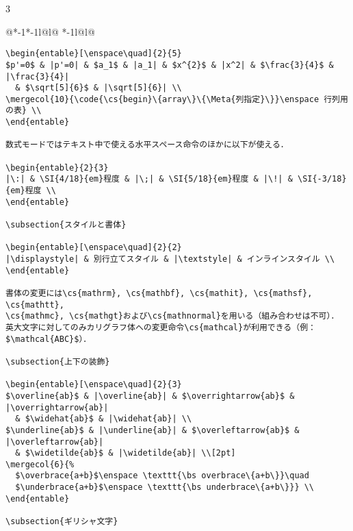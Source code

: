 \documentclass[10pt,a4paper,landscape,dvipdfmx,nomag]{jsarticle}
\makeatletter
\def\set@etsep#1#2{\def\etcolsep{#1}\def\etitemsep{#2}}
\newenvironment{entable}[3][\quad\qquad]{%
  \set@etsep#1\relax\relax
  \begin{tabular}{%
    @{}*{\the\numexpr#3-1}{*{\the\numexpr#2-1}{l@{\etcolsep}}l@{\etitemsep}}%
    *{\the\numexpr#2-1}{l@{\etcolsep}}l@{}}}{%
  \end{tabular}}
\newcommand{\mergecol}[2]{\multicolumn{#1}{@{}l@{}}{#2}}
\newcommand*\eghostguarded{%
  \ifmmode \expandafter\@firstofone
  \else \expandafter\pxqgg@eghostguarded@a
  \fi}
\def\pxqgg@eghostguarded@a#1{%
  {\pxqgg@TI\pxqgg@cwm}%
  #1%
  {\pxqgg@TI\pxqgg@cwm}}
\newcommand{\codefont}{\ttfamily\gtfamily}
\newcommand{\cs}[1]{\eghostguarded{{\codefont \bs #1}}}
\newcommand{\code}[1]{\eghostguarded{{\codefont #1}}}
\newcommand{\Meta}[1]{$\langle$\mbox{}\emph{#1}\mbox{}$\rangle$}
\makeatother
\begin{document}
\begin{multicols}{3}
\begin{entable}[\enspace]{2}{1}
\begin{verbatim}
\begin{entable}[\enspace\quad]{2}{5}
$p'=0$ & |p'=0| & $a_1$ & |a_1| & $x^{2}$ & |x^2| & $\frac{3}{4}$ & |\frac{3}{4}|
  & $\sqrt[5]{6}$ & |\sqrt[5]{6}| \\
\mergecol{10}{\code{\cs{begin}\{array\}\{\Meta{列指定}\}}\enspace 行列用の表} \\
\end{entable}

数式モードではテキスト中で使える水平スペース命令のほかに以下が使える．

\begin{entable}{2}{3}
|\:| & \SI{4/18}{em}程度 & |\;| & \SI{5/18}{em}程度 & |\!| & \SI{-3/18}{em}程度 \\
\end{entable}

\subsection{スタイルと書体}

\begin{entable}[\enspace\quad]{2}{2}
|\displaystyle| & 別行立てスタイル & |\textstyle| & インラインスタイル \\
\end{entable}

書体の変更には\cs{mathrm}, \cs{mathbf}, \cs{mathit}, \cs{mathsf}, \cs{mathtt},
\cs{mathmc}, \cs{mathgt}および\cs{mathnormal}を用いる（組み合わせは不可）．
英大文字に対してのみカリグラフ体への変更命令\cs{mathcal}が利用できる（例：$\mathcal{ABC}$）．

\subsection{上下の装飾}

\begin{entable}[\enspace\quad]{2}{3}
$\overline{ab}$ & |\overline{ab}| & $\overrightarrow{ab}$ & |\overrightarrow{ab}|
  & $\widehat{ab}$ & |\widehat{ab}| \\
$\underline{ab}$ & |\underline{ab}| & $\overleftarrow{ab}$ & |\overleftarrow{ab}|
  & $\widetilde{ab}$ & |\widetilde{ab}| \\[2pt]
\mergecol{6}{%
  $\overbrace{a+b}$\enspace \texttt{\bs overbrace\{a+b\}}\quad
  $\underbrace{a+b}$\enspace \texttt{\bs underbrace\{a+b\}}} \\
\end{entable}

\subsection{ギリシャ文字}


\end{verbatim}
\end{entable}
\end{multicols}
\end{document}
